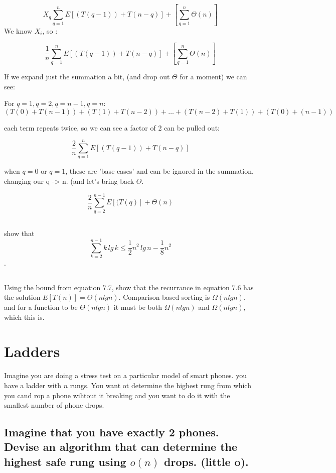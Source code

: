 \documentclass[titlepage]{article}\usepackage[]{graphicx}\usepackage[]{color}
\begin{document}
\[ 
	X_q \sum_{q=1}^{n} E \left[ (T(q-1))+ T(n-q)\right] + \left[ \sum_{q=1}^{n}\Theta(n)\right] 
\]
We know $X_i$, so :

\[ \frac{1}{n} \sum_{q=1}^{n} E \left[ (T(q-1)) + T(n-q)\right] + \left[ \sum_{q=1}^{n}\Theta(n)\right] 
\]

If we expand just the summation a bit, (and drop out $\Theta$ for a moment) we can see:

For $q=1, q=2, q=n-1, q=n$:
\[
	(T(0) + T(n-1)) + (T(1) + T(n-2)) + \ldots + (T(n-2) + T(1)) + (T(0) +
	(n-1))
\]

each term repeats twice, so we can see a factor of 2 can be pulled out:

\[
	\frac{2}{n} \sum_{q=1}^{n} E \left[ (T(q-1)) + T(n-q)\right]  
\]

when $q=0$ or $q=1$, these are 'base cases' and can be ignored in the
summation, changing our q -> n. (and let's bring back $\Theta$.


\[
	\frac{2}{n} \sum_{q=2}^{n-1} E \left[ (T(q)\right] + \Theta(n)
\]


\subsection{}
show that 
\[ \sum_{k=2}^{n-1}k\, lg\, k \leq \frac{1}{2} n^2\, lg\, n - \frac{1}{8} n^2 \].

\subsection{}

Using the bound from equation 7.7, show that the recurrance in equation 7.6 has
the solution $E[T(n)] = \Theta(n lg n)$. 
Comparison-based sorting is $\Omega(n lg n)$, and for a function to be
$\Theta(n lg n)$ it must be both $\Omega(n lg n)$ and $\Omega(n lg n)$, which
this is. 




\section{ Ladders }
  Imagine you are doing a stress test on a particular model of smart phones. you
  have a ladder with $n$ rungs. You want ot determine the highest rung from which
  you cand rop a phone wihtout it breaking and you want to do it with the
smallest number of phone drops. 

\subsection{ Imagine that you have exactly 2 phones. Devise an algorithm that
  can determine
the highest safe rung using $o(n)$ drops. (little o). }
\end{document}
